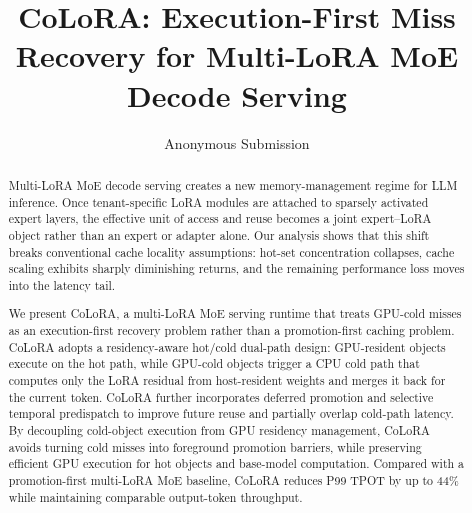 \documentclass[sigplan,anonymous,review,10pt]{acmart}
\begin{document}
\title{CoLoRA: Execution-First Miss Recovery for Multi-LoRA MoE Decode Serving}


\author{Anonymous Submission}


\begin{abstract}
Multi-LoRA MoE decode serving creates a new memory-management regime for LLM inference. Once tenant-specific LoRA modules are attached to sparsely activated expert layers, the effective unit of access and reuse becomes a joint expert--LoRA object rather than an expert or adapter alone. Our analysis shows that this shift breaks conventional cache locality assumptions: hot-set concentration collapses, cache scaling exhibits sharply diminishing returns, and the remaining performance loss moves into the latency tail.

We present CoLoRA, a multi-LoRA MoE serving runtime that treats GPU-cold misses as an execution-first recovery problem rather than a promotion-first caching problem. CoLoRA adopts a residency-aware hot/cold dual-path design: GPU-resident objects execute on the hot path, while GPU-cold objects trigger a CPU cold path that computes only the LoRA residual from host-resident weights and merges it back for the current token. CoLoRA further incorporates deferred promotion and selective temporal predispatch to improve future reuse and partially overlap cold-path latency. By decoupling cold-object execution from GPU residency management, CoLoRA avoids turning cold misses into foreground promotion barriers, while preserving efficient GPU execution for hot objects and base-model computation. Compared with a promotion-first multi-LoRA MoE baseline, CoLoRA reduces P99 TPOT by up to 44\% while maintaining comparable output-token throughput.
\end{abstract}
\end{document}
